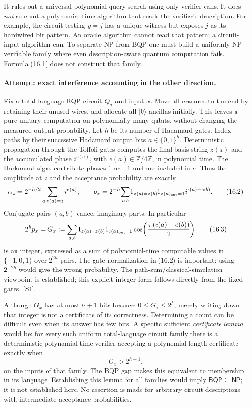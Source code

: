 \documentclass[11pt,a4paper]{article}
\newcommand{\Z}{\mathbb{Z}}
\newcommand{\sref}[2]{\hyperlink{source:#1:#2}{[S#2]}}
\begin{document}
It rules out a universal polynomial-query search using only verifier
calls. It does \emph{not} rule out a polynomial-time algorithm that reads
the verifier's description. For example, the circuit testing $y=j$ has
a unique witness but exposes $j$ as its hardwired bit pattern. An oracle
algorithm cannot read that pattern; a circuit-input algorithm can. To
separate NP from BQP one must build a uniformly NP-verifiable family
where even description-aware quantum computation fails. Formula (16.1)
does not construct that family.

\paragraph{Attempt: exact interference accounting in the other direction.}
Fix a total-language BQP circuit $Q_n$ and input $x$. Move all erasures to
the end by retaining their unused wires, and allocate all $|0\rangle$
ancillas initially. This leaves a pure unitary computation on polynomially
many qubits, without changing the measured output probability. Let $h$
be its number of Hadamard gates. Index paths by their successive Hadamard
output bits $a\in\{0,1\}^h$. Deterministic propagation through the Toffoli
gates computes the final basis string $z(a)$ and the accumulated phase
$i^{e(a)}$, with $e(a)\in\Z/4\Z$, in polynomial time.
The Hadamard signs contribute phases $1$ or $-1$ and are included in $e$.
Thus the amplitude at $z$ and the acceptance probability are exactly
\[
 \alpha_z=2^{-h/2}\sum_{a:z(a)=z}i^{e(a)},\qquad
 p_x=2^{-h}\!\sum_{a,b}\!
 1_{z(a)=z(b)}1_{z(a)_{\rm out}=1}i^{e(a)-e(b)}.
 \tag{16.2}
\]
Conjugate pairs $(a,b)$ cancel imaginary parts. In particular
\[
 2^hp_x=G_x:=\sum_{a,b}
 1_{z(a)=z(b)}1_{z(a)_{\rm out}=1}
 \cos\!\left(\frac{\pi(e(a)-e(b))}{2}\right)
 \tag{16.3}
\]
is an integer, expressed as a sum of polynomial-time computable values
in $\{-1,0,1\}$ over $2^{2h}$ pairs. The gate normalization in (16.2)
is important: using $2^{-2h}$ would give the wrong probability.
The path-sum/classical-simulation viewpoint is established; this explicit
integer form follows directly from the fixed gates. \sref{statement}{1}.

Although $G_x$ has at most $h+1$ bits because $0\leq G_x\leq2^h$, merely
writing down that integer is not a certificate of its correctness.
Determining a count can be difficult even when its answer has few bits.
A specific sufficient \emph{certificate lemma} would be: for every such
uniform total-language circuit family there is a deterministic
polynomial-time verifier accepting a polynomial-length certificate exactly
when
\[
 G_x>2^{h-1},
 \tag{16.4}
\]
on the inputs of that family. The BQP gap makes this equivalent to
membership in its language. Establishing this lemma for all families
would imply $\mathsf{BQP}\subseteq\mathsf{NP}$; it is not established here.
No assertion is made for arbitrary circuit descriptions with intermediate
acceptance probabilities.
\end{document}
